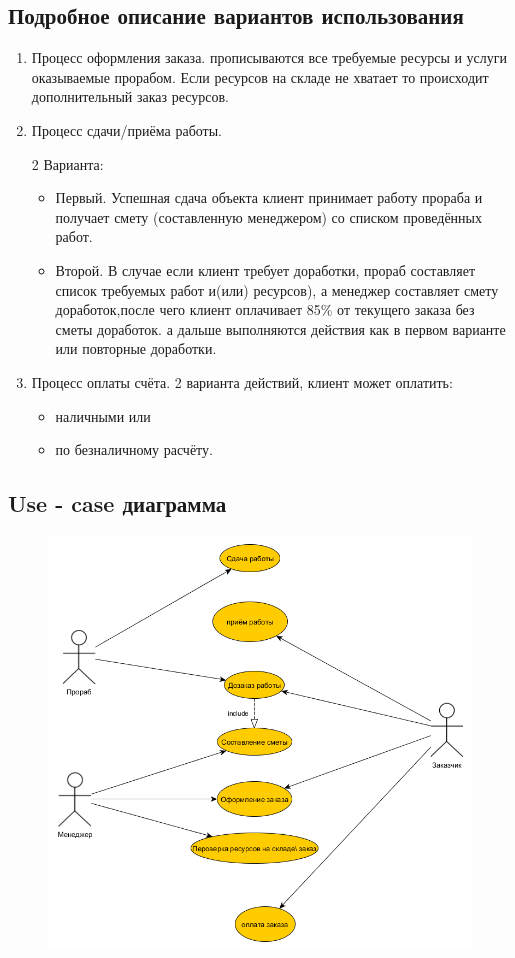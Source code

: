 \documentclass[12pt,a4paper,titlepage]{article}
\begin{document}
\subsection{Подробное описание вариантов использования}
\begin{enumerate}
\item
Процесс оформления заказа. прописываются все требуемые ресурсы и услуги оказываемые прорабом. Если ресурсов на складе не хватает то происходит дополнительный заказ ресурсов.
\item
Процесс сдачи/приёма работы.

2 Варианта:
\begin{itemize}
\item Первый. Успешная сдача объекта клиент принимает работу прораба и получает смету (составленную менеджером) со списком проведённых работ.
\item Второй. В случае если клиент требует доработки, прораб составляет список требуемых работ и(или) ресурсов), а менеджер составляет смету доработок,после чего клиент оплачивает 85\% от текущего заказа без сметы доработок. а дальше выполняются действия как в первом варианте или повторные доработки.
\end{itemize}
\item
Процесс оплаты счёта. 2 варианта действий, клиент может оплатить:
	\begin{itemize}
		\item наличными или
		\item по безналичному расчёту.
	\end{itemize}
\end{enumerate}
\newpage
\subsection{Use - case диаграмма}
\begin{figure}[!ht]
\includegraphics[scale=0.5]{uml_use_case.png}\caption{}
\end{figure}
\newpage
\end{document}
